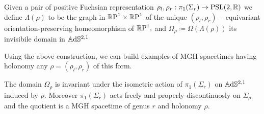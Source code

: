 \begin{definition}
    Given a pair of positive Fuchsian representation $\rho_l,\rho_r:\pi_1(\Sigma_r)\to\text{PSL}(2,\mathbb{R})$ we define $\Lambda(\rho)$ to be the graph in $\mathbb{R}\text{P}^1\times\mathbb{R}\text{P}^1$ of the unique $(\rho_l,\rho_r)-$equivariant orientation-preserving homeomorphism of $\mathbb{R}\text{P}^1,$ and $\Omega_\rho \coloneqq \Omega(\Lambda(\rho))$ its invisibile domain in $\mathbb{A}\mathrm{d}\mathbb{S}^{2,1}$
\end{definition}

Using the above construction, we can build examples of MGH spacetimes having holonomy any $\rho=(\rho_l,\rho_r)$ of this form. 

\begin{proposition}\label{examplesgenustwo}
    The domain $\Omega_\rho$ is invariant under the isometric action of $\pi_1(\Sigma_r)$ on $\mathbb{A}\mathrm{d}\mathbb{S}^{2,1}$ induced by $\rho.$ Moreover $\pi_1(\Sigma_r)$ acts freely and properly discontinuosly on $\Sigma_\rho$ and the quotient is a MGH spacetime of genus $r$ and holonomy $\rho.$ 
\end{proposition}
